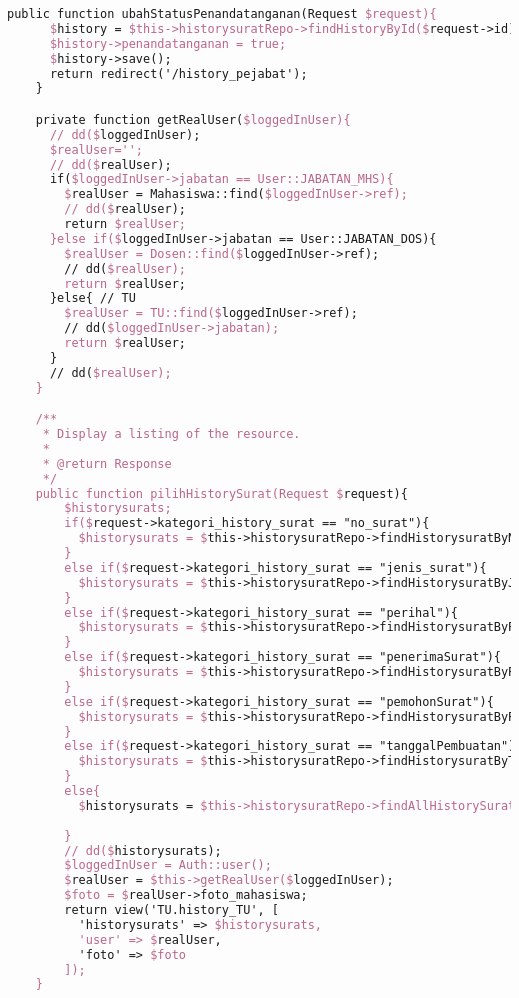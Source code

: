 \begin{lstlisting}[language=tex,basicstyle=\tiny,caption=HistorysuratController.php]
    public function ubahStatusPenandatanganan(Request $request){
      $history = $this->historysuratRepo->findHistoryById($request->id);
      $history->penandatanganan = true;
      $history->save();
      return redirect('/history_pejabat');
    }

    private function getRealUser($loggedInUser){
      // dd($loggedInUser);
      $realUser='';
      // dd($realUser);
      if($loggedInUser->jabatan == User::JABATAN_MHS){
        $realUser = Mahasiswa::find($loggedInUser->ref);
        // dd($realUser);
        return $realUser;
      }else if($loggedInUser->jabatan == User::JABATAN_DOS){
        $realUser = Dosen::find($loggedInUser->ref);
        // dd($realUser);
        return $realUser;
      }else{ // TU
        $realUser = TU::find($loggedInUser->ref);
        // dd($loggedInUser->jabatan);
        return $realUser;
      }
      // dd($realUser);
    }

    /**
	 * Display a listing of the resource.
	 *
	 * @return Response
	 */
	public function pilihHistorySurat(Request $request){
        $historysurats;
        if($request->kategori_history_surat == "no_surat"){
          $historysurats = $this->historysuratRepo->findHistorysuratByNomorSurat($request->searchBox);
        }
        else if($request->kategori_history_surat == "jenis_surat"){
          $historysurats = $this->historysuratRepo->findHistorysuratByJenisSurat($request->searchBox);
        }
        else if($request->kategori_history_surat == "perihal"){
          $historysurats = $this->historysuratRepo->findHistorysuratByPerihal($request->searchBox);
        }
        else if($request->kategori_history_surat == "penerimaSurat"){
          $historysurats = $this->historysuratRepo->findHistorysuratByPenerimaSurat($request->searchBox);
        }
        else if($request->kategori_history_surat == "pemohonSurat"){
          $historysurats = $this->historysuratRepo->findHistorysuratByPemohonSurat($request->searchBox);
        }
        else if($request->kategori_history_surat == "tanggalPembuatan"){
          $historysurats = $this->historysuratRepo->findHistorysuratByTanggalPembuatan($request->searchBox);
        }
        else{
          $historysurats = $this->historysuratRepo->findAllHistorySurat();
          
        }
        // dd($historysurats);
        $loggedInUser = Auth::user();
        $realUser = $this->getRealUser($loggedInUser);
        $foto = $realUser->foto_mahasiswa;
        return view('TU.history_TU', [
          'historysurats' => $historysurats,
          'user' => $realUser,
          'foto' => $foto
        ]);
	}


\end{lstlisting}
